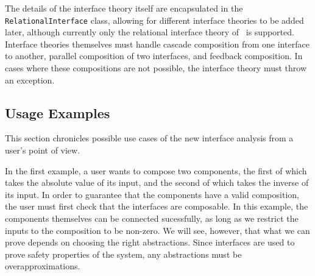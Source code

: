 \documentclass[preprint,11pt]{sigplanconf}
\begin{document}
The details of the interface theory itself are encapsulated in the
\texttt{RelationalInterface} class, allowing for different interface theories
to be added later, although currently only the relational interface theory
of~\cite{relationalInterfaces} is supported. Interface theories themselves must
handle cascade composition from one interface to another, parallel composition
of two interfaces, and feedback composition. In cases where these compositions
are not possible, the interface theory must throw an exception.

\subsection{Usage Examples}
This section chronicles possible use cases of the new interface analysis from a
user's point of view.

In the first example, a user wants to compose two components, the first of
which takes the absolute value of its input, and the second of which takes the
inverse of its input. In order to guarantee that the components have a valid
composition, the user must first check that the interfaces are composable.
In this example, the components themselves can be connected sucessfully, as
long as we restrict the inputs to the composition to be non-zero.  We will see,
however, that what we can prove depends on choosing the right abstractions.
Since interfaces are used to prove safety properties of the system, any
abstractions must be overapproximations.
\end{document}
